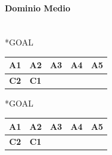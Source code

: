 \documentclass[a4paper,oneside,12pt]{book}
\begin{document}
    \paragraph*{Dominio Medio\\\\}
    \begin{minipage}{0.45\textwidth}

        \begin{center}
            *{GOAL}
            \begin{tabular}{|c | c| c | c | c |}
                \hline
                A1&A2&A3&A4&A5\\
                \hline
                \textbf{C2}&\textbf{C1}&&&\\
                \hline
            \end{tabular}

        \end{center}
    \end{minipage}
    \begin{minipage}{0.45\textwidth}

        \begin{center}
            *{GOAL}
            \begin{tabular}{|c | c| c | c | c |}
                \hline
                A1&A2&A3&A4&A5\\
                \hline
                \textbf{C2}&\textbf{C1}&&&\\
                \hline
            \end{tabular}

        \end{center}
    \end{minipage}
\end{document}
